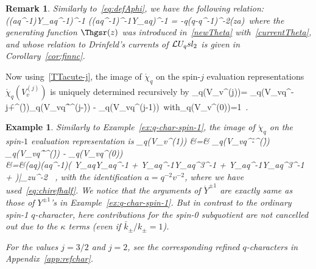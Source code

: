 \documentclass[11pt]{amsart}
\numberwithin{equation}{section}
\newtheorem{example}[thm]{Example}
\newtheorem{rem}[thm]{Remark}
\numberwithin{equation}{section}
\begin{document}
\begin{rem}
Similarly to~\eqref{eq:defAphi}, we have the following relation:
    \beqa
\Bigl(\kappa(aq^{-1})\acute Y_{aq^{-1}}\Bigr)^{-1} \Bigl(\kappa(aq^{-1})^{-1}\acute Y_{aq}\Bigr)^{-1} = -q(q-q^{-1})^{-2}\Thgsr(za)\ 
    \label{eq:YYcute}
    \eeqa
where the generating function $\Thgsr(z)$ was introduced in~\eqref{newTheta} with~\eqref{currentTheta}, and whose relation to Drinfeld's currents of $\mathcal{L} U_q sl_2$ is given in Corollary~\ref{cor:finnc}.
\end{rem}

Now using~\eqref{TTacute-j}, the image of $\acute{\chi}_q$ on the spin-$j$ evaluation representations $\acute{\chi}_q(V_{v}^{(j)})$ is
uniquely determined recursively by
\beqa\label{eq:chichirecOq}
\acute{\chi}_q(V_v^{(j)})= \acute{\chi}_q\Bigl(V_{vq^{-j+\h}}^{(\h)}\Bigr)\acute{\chi}_q\Bigl(V_{vq^\h}^{(j-\h)}\Bigr) - \acute{\chi}_q\Bigl(V_{vq}^{(j-1)}\Bigr)\ \quad \mbox{with}\quad \acute{\chi}_q(V_v^{(0)})=1\ .
\eeqa
\begin{example}\label{valchi1} Similarly to Example~\ref{ex:q-char-spin-1},
 the image of $\acute{\chi}_q$ on the spin-$1$ evaluation representation is 
 \beqa
\acute\chi_q(V_v^{(1)}) &=&
\acute\chi_q\Bigl(V_{vq^{-\h}}^{(\h)}\Bigr) \acute\chi_q\Bigl(V_{vq^\h}^{(\h)}\Bigr)  - \acute\chi_q\bigl(V_{vq}^{(0)}\bigr) \label{eq:chi-spin11stline}\\
&=&\kappa(aq)\kappa(aq^{-1})\Bigl( \frac{\bar k_+^2}{k_+^2}\acute Y_{aq}\acute Y_{aq^{-1}} + \frac{\bar k_+\bar k_-}{k_+k_-}\acute Y_{aq^{-1}}\acute Y_{aq^{3}}^{-1} + \acute Y_{aq}^{-1}\acute Y_{aq^{3}}^{-1} +   \Bigr)\Bigg|_{z\rightarrow u^{-2}}\! \!\!\!\! \ ,\label{eq:acutchi-spin1}
 \eeqa
 with the identification $a=q^{-2}v^{-2}$, where we have used~\eqref{eq:chirefhalf}. We notice that the arguments of ${\acute Y}^{\pm1}$ are exactly same as those of $Y^{\pm1}$'s in Example~\ref{ex:q-char-spin-1}. But in contrast to the ordinary spin-1 $q$-character, here contributions for the spin-0 subquotient are not cancelled out due to the $\kappa$ terms (even if $\bar{k}_{\pm}/k_{\pm}=1$). 
 
 For the values $j=3/2$ and $j=2$, see the corresponding refined $q$-characters in Appendix~\ref{app:refchar}.
\end{example}
\end{document}
